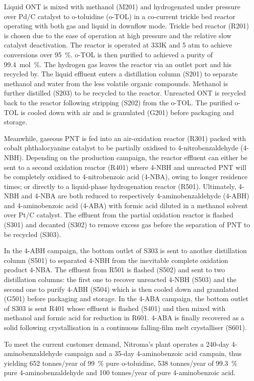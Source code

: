 Liquid ONT is mixed with methanol (M201) and hydrogenated under pressure over Pd/C catalyst to o-toluidine (o-TOL) in a co-current trickle bed reactor operating with both gas and liquid in downflow mode. Trickle bed reactor (R201) is chosen due to the ease of operation at high pressure and the relative slow catalyst deactivation. The reactor is operated at 333K and 5 atm to achieve conversions over \SI{95}{\percent}. o-TOL is then purified to achieved a purity of \SI{99.4}{mol\percent}. The hydrogen gas leaves the reactor via an outlet port and his recycled by. The liquid effluent enters a distillation column (S201) to separate methanol and water from the less volatile organic compounds. Methanol is further distilled (S203) to be recycled to the reactor. Unreacted ONT is recycled back to the reactor following stripping (S202) from the o-TOL. The purified o-TOL is cooled down with air and is granulated (G201) before packaging and storage.

Meanwhile, gaseous PNT is fed into an air-oxidation reactor (R301) packed with cobalt phthalocyanine catalyst to be partially oxidised to 4-nitrobenzaldehyde (4-NBH). Depending on the production campaign, the reactor effluent can either be sent to a second oxidation reactor (R401) where 4-NBH and unreacted PNT will be completely oxidised to 4-nitrobenzoic acid (4-NBA), owing to longer residence times; or directly to a liquid-phase hydrogenation reactor (R501). Ultimately, 4-NBH and 4-NBA are both reduced to respectively 4-aminobenzaldehyde (4-ABH) and 4-aminobenzoic acid (4-ABA) with formic acid diluted in a methanol solvent over Pt/C catalyst. The effluent from the partial oxidation reactor is flashed (S301) and decanted (S302) to remove excess gas before the separation of PNT to be recycled (S303). 

In the 4-ABH campaign, the bottom outlet of S303 is sent to another distillation column (S501) to separated 4-NBH from the inevitable complete oxidation product 4-NBA. The effluent from R501 is flashed (S502) and sent to two distillation columns: the first one to recover unreacted 4-NBH (S503) and the second one to purify 4-ABH (S504) which is then cooled down and granulated (G501) before packaging and storage.  
In the 4-ABA campaign, the bottom outlet of S303 is sent R401 whose effluent is flashed (S401) and then mixed with methanol and formic acid for reduction in R601. 4-ABA is finally recovered as a solid following  crystallisation in a continuous falling-film melt crystalliser (S601).

To meet the current customer demand, Nitroma's plant operates a 240-day 4-aminobenzaldehyde campaign and a 35-day 4-aminobenzoic acid campain, thus yielding 652 tonnes/year of \SI{99}{\percent} pure o-toluidine, 538 tonnes/year of \SI{99.3}{\percent} pure 4-aminobenzaldehyde and 100 tonnes/year of pure 4-aminobenzoic acid.

